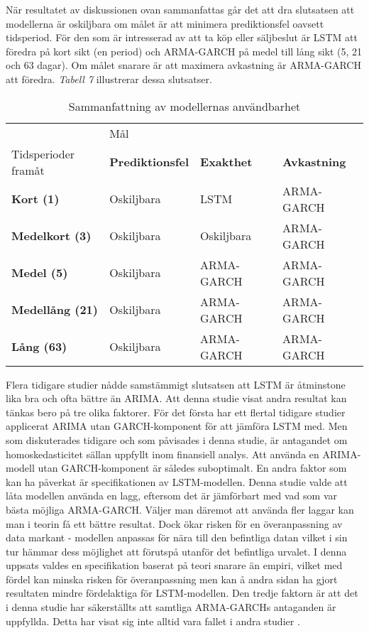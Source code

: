 \documentclass[11pt]{article}
\begin{document}
När resultatet av diskussionen ovan sammanfattas går det att dra slutsatsen att modellerna är oskiljbara om målet är att minimera prediktionsfel oavsett tidsperiod. För den som är intresserad av att ta köp eller säljbeslut är LSTM att föredra på kort sikt (en period) och ARMA-GARCH på medel till lång sikt (5, 21 och 63 dagar). Om målet snarare är att maximera avkastning är ARMA-GARCH att föredra. \emph{Tabell 7} illustrerar dessa slutsatser.

\begin{table}[H]
\caption{Sammanfattning av modellernas användbarhet}
\begin{adjustbox}{width=1\textwidth}
\begin{tabular}{||llll||}
\hline
& \multicolumn{3}{l||}{Mål} \\
Tidsperioder framåt & \textbf{Prediktionsfel} & \textbf{Exakthet} & \textbf{Avkastning}\\ \hline\hline
{\textbf{Kort (1)}} & Oskiljbara          & LSTM & ARMA-GARCH\\ \cline{2-4} 
{\textbf{Medelkort (3)}} & Oskiljbara          & Oskiljbara & ARMA-GARCH\\ \cline{2-4} 
{\textbf{Medel (5)}}       & Oskiljbara        & ARMA-GARCH & ARMA-GARCH\\ \cline{2-4}
{\textbf{Medellång (21)}}       & Oskiljbara        & ARMA-GARCH & ARMA-GARCH\\ \cline{2-4}
{\textbf{Lång (63)}}       & Oskiljbara        & ARMA-GARCH & ARMA-GARCH \\
\hline
\end{tabular}
\end{adjustbox}
\end{table}

Flera tidigare studier nådde samstämmigt slutsatsen att LSTM är åtminstone lika bra och ofta bättre än ARIMA. Att denna studie visat andra resultat kan tänkas bero på tre olika faktorer. För det första har ett flertal tidigare studier applicerat ARIMA utan GARCH-komponent för att jämföra LSTM med. Men som diskuterades tidigare och som påvisades i denna studie, är antagandet om homoskedasticitet sällan uppfyllt inom finansiell analys. Att använda en ARIMA-modell utan GARCH-komponent är således suboptimalt. En andra faktor som kan ha påverkat är specifikationen av LSTM-modellen. Denna studie valde att låta modellen använda en lagg, eftersom det är jämförbart med vad som var bästa möjliga ARMA-GARCH. Väljer man däremot att använda fler laggar kan man i teorin få ett bättre resultat. Dock ökar risken för en överanpassning av data markant -  modellen anpassas för nära till den befintliga datan vilket i sin tur hämmar dess möjlighet att förutspå utanför det befintliga urvalet. I denna uppsats valdes en specifikation baserat på teori snarare än empiri, vilket med fördel kan minska risken för överanpassning men kan å andra sidan ha gjort resultaten mindre fördelaktiga för LSTM-modellen. Den tredje faktorn är att det i denna studie har säkerställts att samtliga ARMA-GARCHs antaganden är uppfyllda. Detta har visat sig inte alltid vara fallet i andra studier \parencite{paliwal2009neural}. 
\end{document}
